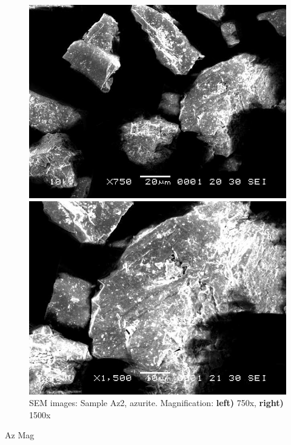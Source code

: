 \begin{figure}[H]
\centering
\begin{minipage}{.45\textwidth}
  \centering
  \includegraphics[width=\linewidth]{Az2_x750_1_150321}
\end{minipage}
\begin{minipage}{.45\textwidth}
  \centering
  \includegraphics[width=\linewidth]{Az2_x1500_1_150321}
\end{minipage}
\caption[SEM images: Sample Az2, azurite]{SEM images: Sample Az2, azurite. Magnification: \textbf{left)} 750x, \textbf{right)} 1500x}
\label{fig:az2_sem_2}
\end{figure}


Az Mag

